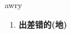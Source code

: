 
\begin{frame}
{\huge awry}
\begin{center}
\begin{enumerate}\Large
  \item \textbf{出差错的(地)}
\end{enumerate}
\end{center}
\end{frame}
